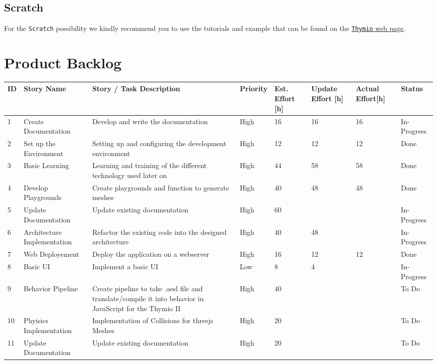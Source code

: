 \documentclass{scrbook}
\begin{document}
\section{Scratch}

For the \texttt{Scratch} possibility we kindly recommend you to use the tutorials and example that can be found on the \href{https://www.thymio.org/program/scratch/}{\texttt{Thymio} web page}.

\chapter{Product Backlog}
\begin{longtable}{p{5mm}|p{2cm}|p{4cm}|p{1cm}|p{1cm}|p{1cm}|p{1cm}|p{15mm}}
  ID                     & Story Name & Story / Task Description & Priority & Est. Effort {[}h{]} & Update Effort {[}h{]} & Actual Effort{[}h{]} & Status                \\ \hline
  1 & Create Documentation & Develop and write the documentation & High & 16 & 16 & 16 & In-Progress \\ 
  2 & Set up the Environment & Setting up and configuring the development environment & High & 12 & 12 & 12 & Done \\ 
  3 & Basic Learning & Learning and training of the different technology used later on & High & 44 & 58 & 58 & Done \\ 
  4 & Develop Playgrounds & Create playgrounds and function to generate meshes & High & 40 & 48 & 48 & Done \\ 
  5 & Update Documentation & Update existing documentation & High & 60 &  &  & In-Progress \\
  6 & Architecture Implementation & Refactor the existing code into the designed architecture & High & 40 & 48 &  & In-Progress\\ 
  7 & Web Deployement & Deploy the application on a webserver & High & 16 & 12 & 12 & Done \\ 
  8 & Basic UI & Implement a basic UI & Low & 8 & 4 &  & In-Progress \\ 
  9 & Behavior Pipeline & Create pipeline to take .aesl file and translate/compile it into behavior in JavaScript for the Thymio II & High & 40 &  &  & To Do \\ 
  10 & Phyisics Implementation & Implementation of Collisions for threejs Meshes & High & 20 &  &  & To Do \\ 
  11 & Update Documentation & Update existing documentation & High & 20 &  &  & To Do \\ 

\end{longtable}
\end{document}
